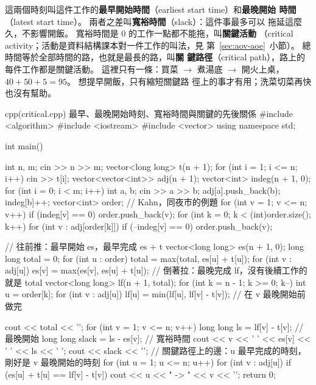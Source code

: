 這兩個時刻叫這件工作的\textbf{最早開始時間}（earliest start time）和\textbf{最晚開始
時間}（latest start time）。 兩者之差叫\textbf{寬裕時間}（slack）：這件事最多可以
拖延這麼久，不影響開飯。 寬裕時間是 $0$ 的工作一點都不能拖，叫\textbf{關鍵活動}
（critical activity；活動是資料結構課本對一件工作的叫法，見
第~\ref{sec:aov-aoe}~小節）。 總時間等於全部時間的路，也就是最長的路，叫\textbf{關
鍵路徑}（critical path），路上的每件工作都是關鍵活動。 這裡只有一條：買菜
$\to$ 煮湯底 $\to$ 開火上桌，$40 + 50 + 5 = 95$。 想提早開飯，只有縮短關鍵路
徑上的事才有用；洗菜切菜再快也沒有幫助。

\begin{example}[label=ex:critical]{cpp}{(critical.cpp) 最早、最晚開始時刻、寬裕時間與關鍵的先後關係}
#include <algorithm>
#include <iostream>
#include <vector>
using namespace std;

int main() {
    int n, m;
    cin >> n >> m;
    vector<long long> t(n + 1);
    for (int i = 1; i <= n; i++) {
        cin >> t[i];
    }
    vector<vector<int>> adj(n + 1);
    vector<int> indeg(n + 1, 0);
    for (int i = 0; i < m; i++) {
        int a, b;
        cin >> a >> b;
        adj[a].push_back(b);
        indeg[b]++;
    }
    vector<int> order;                  // Kahn，同夜市的例題
    for (int v = 1; v <= n; v++) {
        if (indeg[v] == 0) {
            order.push_back(v);
        }
    }
    for (int k = 0; k < (int)order.size(); k++) {
        for (int v : adj[order[k]]) {
            if (--indeg[v] == 0) {
                order.push_back(v);
            }
        }
    }

    // 往前推：最早開始 es，最早完成 es + t
    vector<long long> es(n + 1, 0);
    long long total = 0;
    for (int u : order) {
        total = max(total, es[u] + t[u]);
        for (int v : adj[u]) {
            es[v] = max(es[v], es[u] + t[u]);
        }
    }
    // 倒著拉：最晚完成 lf，沒有後續工作的就是 total
    vector<long long> lf(n + 1, total);
    for (int k = n - 1; k >= 0; k--) {
        int u = order[k];
        for (int v : adj[u]) {
            lf[u] = min(lf[u], lf[v] - t[v]);  // 在 v 最晚開始前做完
        }
    }

    cout << total << '\n';
    for (int v = 1; v <= n; v++) {
        long long ls = lf[v] - t[v];        // 最晚開始
        long long slack = ls - es[v];       // 寬裕時間
        cout << v << ' ' << es[v] << ' ' << ls << ' ';
        cout << slack << '\n';
    }
    // 關鍵路徑上的邊：u 最早完成的時刻，剛好是 v 最晚開始的時刻
    for (int u = 1; u <= n; u++) {
        for (int v : adj[u]) {
            if (es[u] + t[u] == lf[v] - t[v]) {
                cout << u << " -> " << v << '\n';
            }
        }
    }
    return 0;
}
\end{example}

